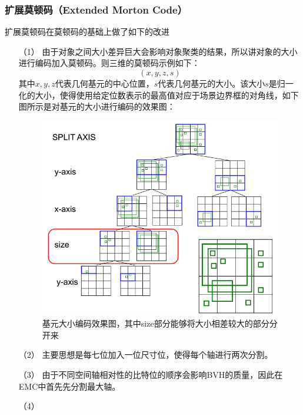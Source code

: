 \documentclass[11pt]{article}
\begin{document}
\subsubsection{扩展莫顿码（Extended Morton Code）}
扩展莫顿码在莫顿码的基础上做了如下的改进
\begin{itemize}
\item[（1）]{}
由于对象之间大小差异巨大会影响对象聚类的结果，所以讲对象的大小进行编码加入莫顿码。则三维的莫顿码示例如下：
$$(x,y,z,s)$$
其中$x,y,z$代表几何基元的中心位置，$s$代表几何基元的大小。该大小$s$是归一化的大小，使得使用给定位数表示的最高值对应于场景边界框的对角线，如下图所示是对基元的大小进行编码的效果图：
\begin{figure}[H]
\begin{center}
\includegraphics[scale=0.6]{EMC.png}
\caption{基元大小编码效果图，其中size部分能够将大小相差较大的部分分开来}
\end{center}
\end{figure}
\item[（2）]{}
主要思想是每七位加入一位尺寸位，使得每个轴进行两次分割。

\item[（3）]{}
由于不同空间轴相对性的比特位的顺序会影响BVH的质量，因此在EMC中首先先分割最大轴。

\item[（4）]{\bm{}}

\end{itemize}
\end{document}
